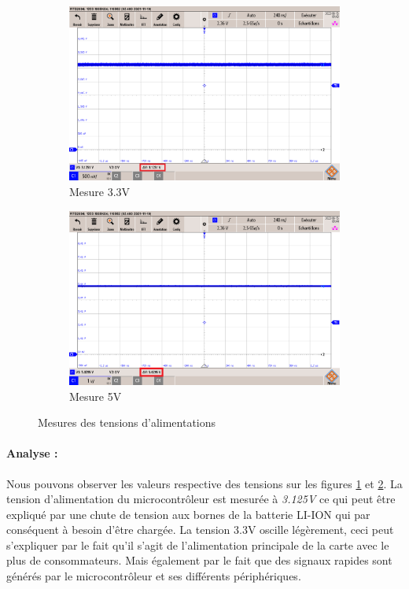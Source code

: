 {	\begin{figure}
	\begin{subfigure}{.5\textwidth}
		\centering
		\includegraphics[width=\textwidth]{Mesures/Tension3.3V}
		\caption{Mesure 3.3V}
		\label{fig:Mes3.3V}
	\end{subfigure}
	\begin{subfigure}{.5\textwidth}
		\centering
		\includegraphics[width=\textwidth]{Mesures/Tension5V}
		\caption{Mesure 5V}
		\label{fig:Mes5V}
	\end{subfigure}
	\caption{Mesures des tensions d'alimentations}
	\label{fig:Mesure3.3et5V}
	\end{figure}
	
	\paragraph{Analyse :} Nous pouvons observer les valeurs respective des tensions sur les figures \ref{fig:Mes3.3V} et \ref{fig:Mes5V}. La tension d'alimentation du microcontrôleur est mesurée à \textit{3.125V} ce qui peut être expliqué par une chute de tension aux bornes de la batterie LI-ION qui par conséquent à besoin d'être chargée. La tension 3.3V oscille légèrement, ceci peut s'expliquer par le fait qu'il s'agit de l'alimentation principale de la carte avec le plus de consommateurs. Mais également par le fait que des signaux rapides sont générés par le microcontrôleur et ses différents périphériques.
	
}
